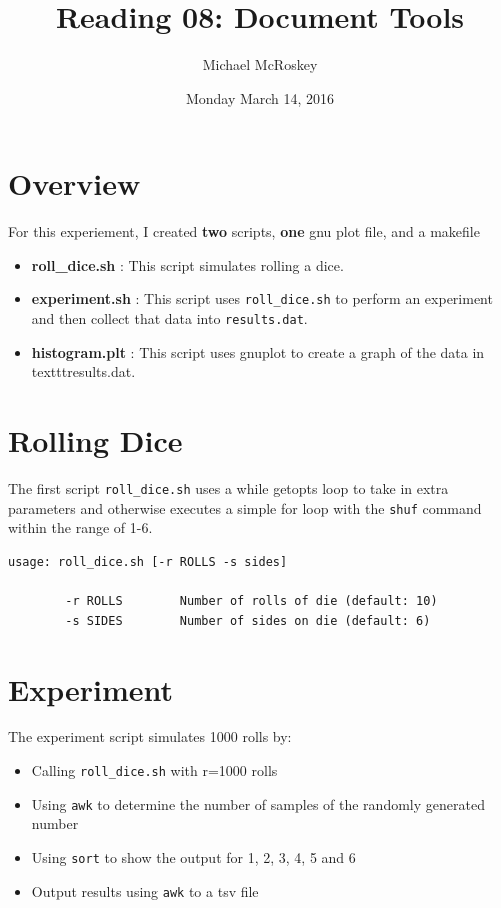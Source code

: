 \documentclass[letterpaper]{article}
\title{Reading 08: Document Tools}
\date{Monday March 14, 2016}
\author{Michael McRoskey}
\begin{document}
\maketitle


\section*{Overview}

For this experiement, I created {\bf two} scripts, {\bf one} gnu plot file, and a makefile

\begin{itemize} 
   \item \textbf{roll\_dice.sh} : This script simulates rolling a dice.
   \item \textbf{experiment.sh} : This script uses \texttt{roll\_dice.sh} to perform an experiment and then collect that data
into \texttt{results.dat}.
   \item \textbf{histogram.plt} :  This script uses gnuplot to create a graph of the data in texttt{results.dat}.
 \end{itemize}


\section*{Rolling Dice}

The first script \texttt{roll\_dice.sh} uses a while getopts loop to take in extra parameters and otherwise executes a simple for loop with the \texttt{shuf} command within the range of 1-6.

\begin{verbatim}
usage: roll_dice.sh [-r ROLLS -s sides]

	    -r ROLLS        Number of rolls of die (default: 10)
	    -s SIDES        Number of sides on die (default: 6)
\end{verbatim}



\section*{Experiment}

The experiment script simulates 1000 rolls by:
\begin{itemize}
	\item Calling \texttt{roll\_dice.sh} with r=1000 rolls
	\item Using \texttt{awk} to determine the number of samples of the randomly generated number
	\item Using \texttt{sort} to show the output for 1, 2, 3, 4, 5 and 6
	\item Output results using \texttt{awk} to a tsv file
\end{itemize}
\end{document}
